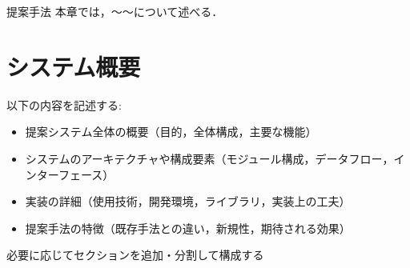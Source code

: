 \chapterhead
{提案手法}
{本章では，〜〜について述べる．}


\section{システム概要}

以下の内容を記述する:

\begin{itemize}
  \item 提案システム全体の概要（目的，全体構成，主要な機能）
  \item システムのアーキテクチャや構成要素（モジュール構成，データフロー，インターフェース）
  \item 実装の詳細（使用技術，開発環境，ライブラリ，実装上の工夫）
  \item 提案手法の特徴（既存手法との違い，新規性，期待される効果）
\end{itemize}

必要に応じてセクションを追加・分割して構成する


\newpage

